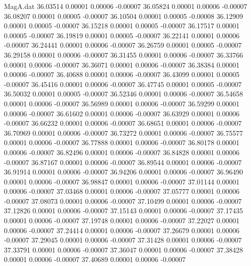 \begin{filecontents}{MagA.dat}
  36.03514    0.00001    0.00006   -0.00007
  36.05824    0.00001    0.00006   -0.00007
  36.08207    0.00001    0.00005   -0.00007
  36.10504    0.00001    0.00005   -0.00008
  36.12909    0.00001    0.00005   -0.00007
  36.15218    0.00001    0.00005   -0.00007
  36.17517    0.00001    0.00005   -0.00007
  36.19819    0.00001    0.00005   -0.00007
  36.22141    0.00001    0.00006   -0.00007
  36.24441    0.00001    0.00006   -0.00007
  36.26759    0.00001    0.00005   -0.00007
  36.29158    0.00001    0.00006   -0.00007
  36.31455    0.00001    0.00006   -0.00007
  36.33766    0.00001    0.00006   -0.00007
  36.36071    0.00001    0.00006   -0.00007
  36.38384    0.00001    0.00006   -0.00007
  36.40688    0.00001    0.00006   -0.00007
  36.43099    0.00001    0.00005   -0.00007
  36.45416    0.00001    0.00006   -0.00007
  36.47745    0.00001    0.00005   -0.00007
  36.50032    0.00001    0.00005   -0.00007
  36.52346    0.00001    0.00006   -0.00007
  36.54658    0.00001    0.00006   -0.00007
  36.56989    0.00001    0.00006   -0.00007
  36.59299    0.00001    0.00006   -0.00007
  36.61602    0.00001    0.00006   -0.00007
  36.63929    0.00001    0.00006   -0.00007
  36.66232    0.00001    0.00006   -0.00007
  36.68651    0.00001    0.00006   -0.00007
  36.70969    0.00001    0.00006   -0.00007
  36.73272    0.00001    0.00006   -0.00007
  36.75577    0.00001    0.00006   -0.00007
  36.77888    0.00001    0.00006   -0.00007
  36.80178    0.00001    0.00006   -0.00007
  36.82496    0.00001    0.00006   -0.00007
  36.84828    0.00001    0.00006   -0.00007
  36.87167    0.00001    0.00006   -0.00007
  36.89544    0.00001    0.00006   -0.00007
  36.91914    0.00001    0.00006   -0.00007
  36.94206    0.00001    0.00006   -0.00007
  36.96490    0.00001    0.00006   -0.00007
  36.98847    0.00001    0.00006   -0.00007
  37.01144    0.00001    0.00006   -0.00007
  37.03468    0.00001    0.00006   -0.00007
  37.05777    0.00001    0.00006   -0.00007
  37.08073    0.00001    0.00006   -0.00007
  37.10499    0.00001    0.00006   -0.00007
  37.12826    0.00001    0.00006   -0.00007
  37.15143    0.00001    0.00006   -0.00007
  37.17435    0.00001    0.00006   -0.00007
  37.19748    0.00001    0.00006   -0.00007
  37.22027    0.00001    0.00006   -0.00007
  37.24414    0.00001    0.00006   -0.00007
  37.26679    0.00001    0.00006   -0.00007
  37.29045    0.00001    0.00006   -0.00007
  37.31428    0.00001    0.00006   -0.00007
  37.33791    0.00001    0.00006   -0.00007
  37.36047    0.00001    0.00006   -0.00007
  37.38428    0.00001    0.00006   -0.00007
  37.40689    0.00001    0.00006   -0.00007

\end{filecontents}
